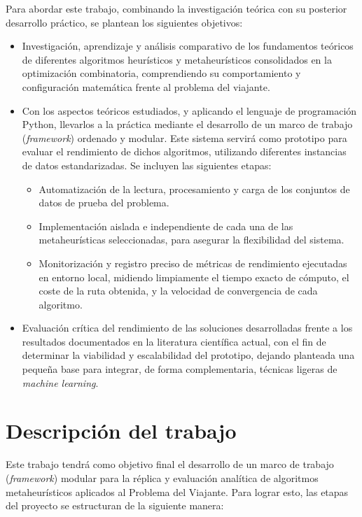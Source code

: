 \documentclass[11pt,a4paper,oneside]{article}
\begin{document}
Para abordar este trabajo, combinando la investigación teórica con su posterior desarrollo práctico, se plantean los siguientes 
objetivos:

\begin{itemize}
  \item Investigación, aprendizaje y análisis comparativo de los fundamentos teóricos de diferentes algoritmos heurísticos y 
  metaheurísticos consolidados en la optimización combinatoria, comprendiendo su comportamiento y configuración matemática frente 
  al problema del viajante.
  \item Con los aspectos teóricos estudiados, y aplicando el lenguaje de programación Python, llevarlos a la práctica mediante el 
  desarrollo de un marco de trabajo (\textit{framework}) ordenado y modular. Este sistema servirá como prototipo para evaluar el 
  rendimiento de dichos algoritmos, utilizando diferentes instancias de datos estandarizadas. Se incluyen las siguientes etapas:
  \begin{itemize}
    \item Automatización de la lectura, procesamiento y carga de los conjuntos de datos de prueba del problema.
    \item Implementación aislada e independiente de cada una de las metaheurísticas seleccionadas, para asegurar la flexibilidad 
    del sistema.
    \item Monitorización y registro preciso de métricas de rendimiento ejecutadas en entorno local, midiendo limpiamente el tiempo 
    exacto de cómputo, el coste de la ruta obtenida, y la velocidad de convergencia de cada algoritmo.
  \end{itemize}
  \item Evaluación crítica del rendimiento de las soluciones desarrolladas frente a los resultados documentados en la literatura 
  científica actual, con el fin de determinar la viabilidad y escalabilidad del prototipo, dejando planteada una pequeña base para 
  integrar, de forma complementaria, técnicas ligeras de \textit{machine learning}.
\end{itemize}

\section{Descripción del trabajo}
\label{sec:descr-del-trab}

Este trabajo tendrá como objetivo final el desarrollo de un marco de trabajo (\textit{framework}) modular para la réplica y evaluación 
analítica de algoritmos metaheurísticos aplicados al Problema del Viajante. Para lograr esto, las etapas del proyecto se estructuran de 
la siguiente manera: 
\end{document}
